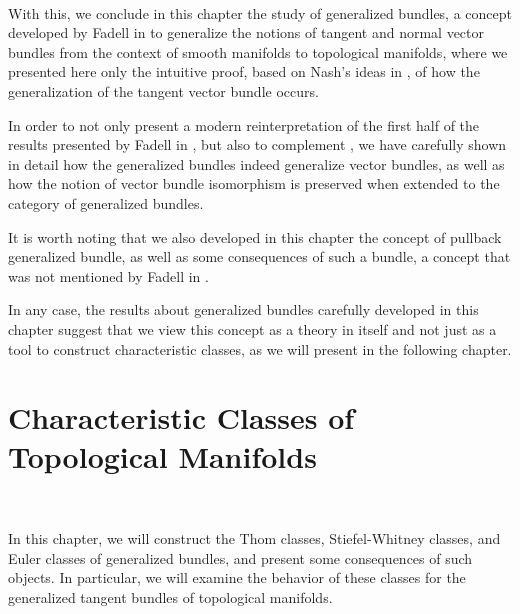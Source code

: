 \documentclass[12pt,oneside]{book}
\begin{document}
    \
    
    With this, we conclude in this chapter the study of generalized bundles, a concept developed by Fadell in \cite{fadell_1} to generalize the notions of tangent and normal vector bundles from the context of smooth manifolds to topological manifolds, where we presented here only the intuitive proof, based on Nash's ideas in \cite{nash}, of how the generalization of the tangent vector bundle occurs.
    
    In order to not only present a modern reinterpretation of the first half of the results presented by Fadell in \cite{fadell_1}, but also to complement \cite{fadell_1}, we have carefully shown in detail how the generalized bundles indeed generalize vector bundles, as well as how the notion of vector bundle isomorphism is preserved when extended to the category of generalized bundles.
    
    It is worth noting that we also developed in this chapter the concept of pullback generalized bundle, as well as some consequences of such a bundle, a concept that was not mentioned by Fadell in \cite{fadell_1}.
    
    In any case, the results about generalized bundles carefully developed in this chapter suggest that we view this concept as a theory in itself and not just as a tool to construct characteristic classes, as we will present in the following chapter.
    




    \chapter{Characteristic Classes of Topological Manifolds}\label{cap_clas_carac}
    \thispagestyle{empty}
    
    \
    
    In this chapter, we will construct the Thom classes, Stiefel-Whitney classes, and 
    Euler classes of generalized bundles, and present some consequences of such objects. 
    In particular, we will examine the behavior of these classes for the generalized tangent bundles of 
    topological manifolds.
    
\end{document}
